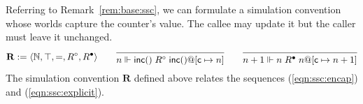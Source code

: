 \documentclass[acmsmall,screen,review,anonymous]{acmart}
\newcommand{\kw}[1]{\ensuremath{ \mathsf{#1} }}
\newcommand{\que}{\circ}
\newcommand{\ans}{\bullet}
\newcommand{\intl}[1]{\underline{#1}}
\begin{document}
\begin{example} \label{ex:base:ssc} %
Referring to Remark~\ref{rem:base:ssc},
we can formulate a simulation convention
whose worlds capture the counter's value.
The callee may update it
but the caller must leave it unchanged.
\[
  \mathbf{R} := \langle \mathbb{N}, \top, {=}, R^\que, R^\ans \rangle
  \qquad
  \begin{prooftree}
    \infer0{n \Vdash \kw{inc}() \mathrel{R^\que} \kw{inc}()@[\kw{c} \mapsto n]}
  \end{prooftree}
  \qquad
  \begin{prooftree}
    \infer0{n + 1 \Vdash n \mathrel{R^\ans} n@[\kw{c} \mapsto n + 1]}
  \end{prooftree}
\]
The simulation convention $\mathbf{R}$ defined above
relates the sequences (\ref{eqn:ssc:encap}) and (\ref{eqn:ssc:explicit}).
\end{example}

\end{document}
